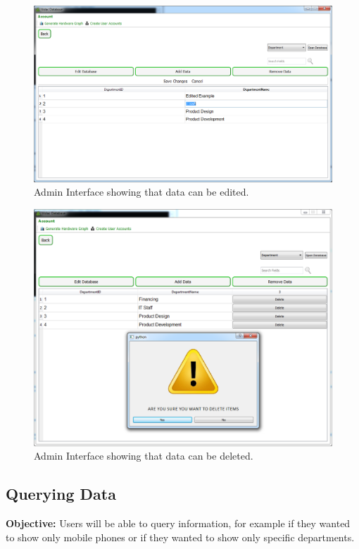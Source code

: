 \begin{figure}[H]
    \includegraphics[width=\textwidth]{./Evaluation/Images/admin2.png}
    \caption{Admin Interface showing that data can be edited.} 
\end{figure}

\begin{figure}[H]
    \includegraphics[width=\textwidth]{./Evaluation/Images/admin3.png}
    \caption{Admin Interface showing that data can be deleted.} 
\end{figure}



\subsection{Querying Data}

\textbf{Objective:} Users will be able to query information, for example if they wanted to show only mobile phones or if they wanted to show only specific departments.

